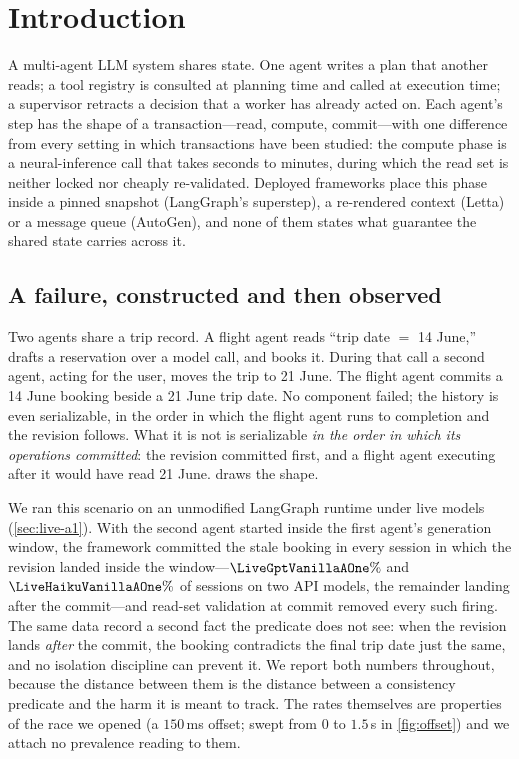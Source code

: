 \section{Introduction}
\label{sec:intro}

A multi-agent LLM system shares state. One agent writes a plan that another
reads; a tool registry is consulted at planning time and called at execution
time; a supervisor retracts a decision that a worker has already acted on. Each
agent's step has the shape of a transaction---read, compute, commit---with one
difference from every setting in which transactions have been studied: the
compute phase is a neural-inference call that takes seconds to minutes, during
which the read set is neither locked nor cheaply re-validated. Deployed
frameworks place this phase inside a pinned snapshot (LangGraph's superstep), a
re-rendered context (Letta) or a message queue (AutoGen), and none of them
states what guarantee the shared state carries across it.

\subsection{A failure, constructed and then observed}
\label{sec:intro-example}
Two agents share a trip record. A flight agent reads ``trip date $=$ 14 June,''
drafts a reservation over a model call, and books it. During that call a second
agent, acting for the user, moves the trip to 21 June. The flight agent commits
a 14 June booking beside a 21 June trip date. No component failed; the history
is even serializable, in the order in which the flight agent runs to completion
and the revision follows. What it is not is serializable \emph{in the order in
which its operations committed}: the revision committed first, and a flight
agent executing after it would have read 21 June.  draws the
shape.

We ran this scenario on an unmodified LangGraph runtime under live models
(\cref{sec:live-a1}). With the second agent started inside the first agent's
generation window, the framework committed the stale booking in every session
in which the revision landed inside the window---$\LiveGptVanillaAOne\%$ and
$\LiveHaikuVanillaAOne\%$ of sessions on two API models, the remainder landing
after the commit---and read-set validation at commit removed every such firing.
The same data record a second fact the predicate does not see: when the
revision lands \emph{after} the commit, the booking contradicts the final trip
date just the same, and no isolation discipline can prevent it. We report both
numbers throughout, because the distance between them is the distance between a
consistency predicate and the harm it is meant to track. The rates themselves
are properties of the race we opened (a $150$\,ms offset; swept from $0$ to
$1.5$\,s in \cref{fig:offset}) and we attach no prevalence reading to them.


